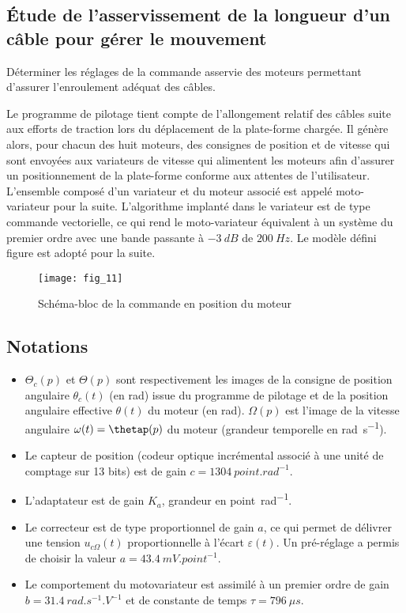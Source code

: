 \subsection*{Étude de l’asservissement de la longueur d’un câble pour gérer le mouvement}

\begin{obj}
Déterminer les réglages de la commande asservie des moteurs permettant d’assurer l’enroulement
 adéquat des câbles.
\end{obj}

Le programme de pilotage tient compte de l’allongement relatif des câbles suite aux efforts de traction lors du déplacement de la plate-forme chargée. Il génère alors, pour chacun des huit moteurs, des consignes de position et de vitesse qui sont envoyées aux variateurs de vitesse qui alimentent les moteurs afin d’assurer un positionnement de la plate-forme conforme aux attentes de l’utilisateur.
L’ensemble composé d’un variateur et du moteur associé est appelé moto-variateur pour la suite. L’algorithme implanté dans le variateur est de type commande vectorielle, ce qui rend le moto-variateur équivalent à un  système du premier ordre avec une bande passante à $-\SI{3}{dB}$ de $\SI{200}{Hz}$.
 Le modèle défini figure \label{Cy_02_Ch_04_TD_01_fig_11} est adopté pour la suite.
 
 \begin{figure} [!h]
\centering
\texttt{[image: fig\_11]}
\caption{Schéma-bloc de la commande en position du moteur \label{Cy_02_Ch_04_TD_01_fig_11}}
\end{figure}

\subsection*{Notations}

\begin{itemize}
\item $\Theta_c(p)$ et $\Theta(p)$ sont respectivement les images de la consigne de position angulaire $\theta_c(t)$ (en rad) issue du programme de pilotage et de la position angulaire effective $\theta(t)$ du moteur (en \si{rad}). $\Omega(p)$ est l’image de la vitesse angulaire $\omega(t)=\thetap(p)$ du moteur (grandeur temporelle en \si{rad.s^{-1}}).
 \item Le capteur de position (codeur optique incrémental associé à une unité de comptage sur 13 bits) est de gain $c=\SI{1304}{point.rad^{-1}}$.
 \item L’adaptateur est de gain $K_a$, grandeur en \si{point.rad^{-1}}.
  \item Le correcteur est de type proportionnel de gain $a$, ce qui permet de délivrer une tension $u_{c\Omega}(t)$ proportionnelle à l’écart $\varepsilon(t)$. Un pré-réglage a permis de choisir la valeur $a=\SI{43,4}{mV.point^{-1}}$.
\item Le comportement du motovariateur est assimilé à un premier ordre de gain $b=\SI{31,4}{rad.s^{-1}.V^{-1}}$ et de constante de temps $\tau = \SI{796}{\mu s}$.
\end{itemize}


